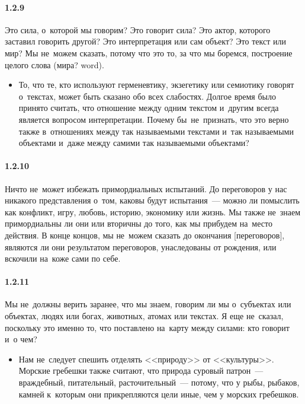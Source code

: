 \paragraph{1.2.9}\hypertarget{par:1.2.9}{} Это сила, о~которой мы говорим? Это говорит сила? Это актор, которого заставил говорить другой? Это интерпретация или сам объект? Это текст или мир? Мы не~можем сказать, потому что это то, за что мы боремся, построение целого слова (мира? word).
	\begin{itemize}
	\item То, что те, кто используют герменевтику, экзегетику или семиотику говорят о~текстах, может быть сказано обо всех слабостях. Долгое время было принято считать, что отношение между одним текстом и~другим всегда является вопросом интерпретации. Почему бы~не~признать, что это верно также в~отношениях между так называемыми текстами и~так называемыми объектами и~даже между самими так называемыми объектами?
	\end{itemize}

\paragraph{1.2.10}\hypertarget{par:1.2.10}{} Ничто не~может избежать примордиальных испытаний. До переговоров у нас никакого представления о~том, каковы будут испытания~--- можно ли помыслить как конфликт, игру, любовь, историю, экономику или жизнь. Мы также не~знаем примордиальны ли они или вторичны до того, как мы прибудем на~место действия. В конце концов, мы не~можем сказать до окончания [переговоров], являются ли они результатом переговоров, унаследованы от рождения, или вскочили на~коже сами по себе.

\paragraph{1.2.11}\hypertarget{par:1.2.11}{} Мы не~должны верить заранее, что мы знаем, говорим ли мы о~субъектах или объектах, людях или богах, животных, атомах или текстах. Я еще не~сказал, поскольку это именно то, что поставлено на~карту между силами: кто говорит и~о чем?
	\begin{itemize}
	\item Нам не~следует спешить отделять <<природу>> от <<культуры>>. Морские гребешки также считают, что природа суровый патрон~--- враждебный, питательный, расточительный~--- потому, что у рыбы, рыбаков, камней к~которым они прикрепляются цели иные, чем у морских гребешков.
	\end{itemize}

